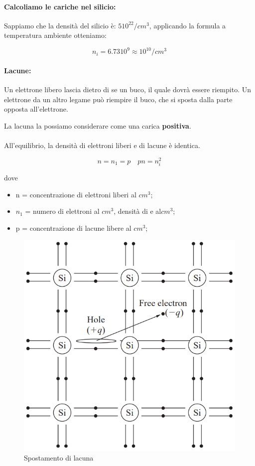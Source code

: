 \paragraph{Calcoliamo le cariche nel silicio:}

Sappiamo che la densità del silicio è: $5 10^{22} /cm^{3}$, applicando la formula a temperatura ambiente otteniamo:

\begin{equation*}
    n_i = 6.73 10^9 \approx 10^{10} /cm^3
\end{equation*}

\paragraph{Lacune: }
Un elettrone libero lascia dietro di se un buco, il quale dovrà essere riempito. Un elettrone da un altro legame può riempire il buco, che si sposta dalla parte opposta all'elettrone.

La lacuna la possiamo considerare come una carica \textbf{positiva}.
\paragraph{}
All'equilibrio, la densità di elettroni liberi e di lacune è identica.

\begin{equation*}
    n = n_1 = p \quad pn = n_i^2
\end{equation*}

dove 
\begin{itemize}
    \item n = concentrazione di elettroni liberi al $cm^3$;
    \item $n_1$ = numero di elettroni al $cm^3$, densità di e al$cm^3$;
    \item p = concentrazione di lacune libere al $cm^3$;
\end{itemize}

\begin{figure}[htbp]
    \centering
    \includegraphics[width=0.4\linewidth]{img/hole.png}
    \caption{Spostamento di lacuna}    
\end{figure}

